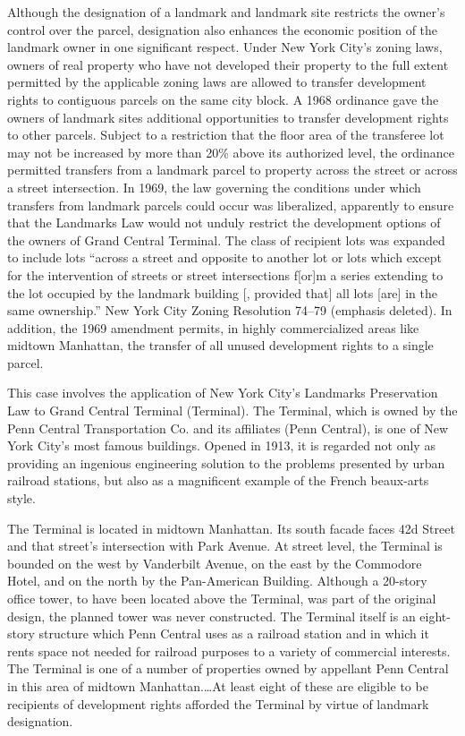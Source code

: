 Although the designation of a landmark and landmark site restricts the owner's
control over the parcel, designation also enhances the economic position of the
landmark owner in one significant respect. Under New York City's zoning laws,
owners of real property who have not developed their property to the full extent
permitted by the applicable zoning laws are allowed to transfer development
rights to contiguous parcels on the same city block. A 1968 ordinance gave the
owners of landmark sites additional opportunities to transfer development rights
to other parcels. Subject to a restriction that the floor area of the transferee
lot may not be increased by more than 20\% above its authorized level, the
ordinance permitted transfers from a landmark parcel to property across the
street or across a street intersection. In 1969, the law governing the
conditions under which transfers from landmark parcels could occur was
liberalized, apparently to ensure that the Landmarks Law would not unduly
restrict the development options of the owners of Grand Central Terminal. The
class of recipient lots was expanded to include lots ``across a street and
opposite to another lot or lots which except for the intervention of streets or
street intersections f[or]m a series extending to the lot occupied by the
landmark building [, provided that] all lots [are] in the same ownership.'' New
York City Zoning Resolution 74--79 (emphasis deleted). In addition, the 1969
amendment permits, in highly commercialized areas like midtown Manhattan, the
transfer of all unused development rights to a single parcel. 



This case involves the application of New York City's Landmarks Preservation Law
to Grand Central Terminal (Terminal). The Terminal, which is owned by the Penn
Central Transportation Co. and its affiliates (Penn Central), is one of New York
City's most famous buildings. Opened in 1913, it is regarded not only as
providing an ingenious engineering solution to the problems presented by urban
railroad stations, but also as a magnificent example of the French beaux-arts
style.

The Terminal is located in midtown Manhattan. Its south facade faces 42d Street
and that street's intersection with Park Avenue. At street level, the Terminal
is bounded on the west by Vanderbilt Avenue, on the east by the Commodore Hotel,
and on the north by the Pan-American Building. Although a 20-story office tower,
to have been located above the Terminal, was part of the original design, the
planned tower was never constructed. The Terminal itself is an eight-story
structure which Penn Central uses as a railroad station and in which it rents
space not needed for railroad purposes to a variety of commercial interests. The
Terminal is one of a number of properties owned by appellant Penn Central in
this area of midtown Manhattan.\ldots At least eight of these are eligible to be
recipients of development rights afforded the Terminal by virtue of landmark
designation.

